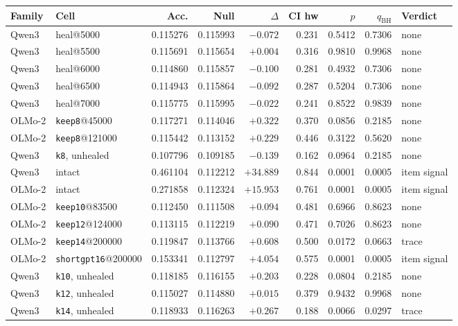 \begin{table}[H]
\centering
\footnotesize
\setlength{\tabcolsep}{1.8pt}
\begin{tabular}{llrrrrrrl}
\toprule
Family & Cell & Acc. & Null & $\Delta$ & CI hw & $p$ & $q_{\mathrm{BH}}$ & Verdict \\
\midrule
Qwen3 & heal@5000 & 0.115276 & 0.115993 & $-0.072$ & 0.231 & 0.5412 & 0.7306 & none \\
Qwen3 & heal@5500 & 0.115691 & 0.115654 & $+0.004$ & 0.316 & 0.9810 & 0.9968 & none \\
Qwen3 & heal@6000 & 0.114860 & 0.115857 & $-0.100$ & 0.281 & 0.4932 & 0.7306 & none \\
Qwen3 & heal@6500 & 0.114943 & 0.115864 & $-0.092$ & 0.287 & 0.5204 & 0.7306 & none \\
Qwen3 & heal@7000 & 0.115775 & 0.115995 & $-0.022$ & 0.241 & 0.8522 & 0.9839 & none \\
OLMo-2 & \texttt{keep8}@45000 & 0.117271 & 0.114046 & $+0.322$ & 0.370 & 0.0856 & 0.2185 & none \\
OLMo-2 & \texttt{keep8}@121000 & 0.115442 & 0.113152 & $+0.229$ & 0.446 & 0.3122 & 0.5620 & none \\
Qwen3 & \texttt{k8}, unhealed & 0.107796 & 0.109185 & $-0.139$ & 0.162 & 0.0964 & 0.2185 & none \\
Qwen3 & intact & 0.461104 & 0.112212 & $+34.889$ & 0.844 & 0.0001 & 0.0005 & item signal \\
OLMo-2 & intact & 0.271858 & 0.112324 & $+15.953$ & 0.761 & 0.0001 & 0.0005 & item signal \\
OLMo-2 & \texttt{keep10}@83500 & 0.112450 & 0.111508 & $+0.094$ & 0.481 & 0.6966 & 0.8623 & none \\
OLMo-2 & \texttt{keep12}@124000 & 0.113115 & 0.112219 & $+0.090$ & 0.471 & 0.7026 & 0.8623 & none \\
OLMo-2 & \texttt{keep14}@200000 & 0.119847 & 0.113766 & $+0.608$ & 0.500 & 0.0172 & 0.0663 & trace \\
OLMo-2 & \texttt{shortgpt16}@200000 & 0.153341 & 0.112797 & $+4.054$ & 0.575 & 0.0001 & 0.0005 & item signal \\
Qwen3 & \texttt{k10}, unhealed & 0.118185 & 0.116155 & $+0.203$ & 0.228 & 0.0804 & 0.2185 & none \\
Qwen3 & \texttt{k12}, unhealed & 0.115027 & 0.114880 & $+0.015$ & 0.379 & 0.9432 & 0.9968 & none \\
Qwen3 & \texttt{k14}, unhealed & 0.118933 & 0.116263 & $+0.267$ & 0.188 & 0.0066 & 0.0297 & trace \\

\end{tabular}
\end{table}
